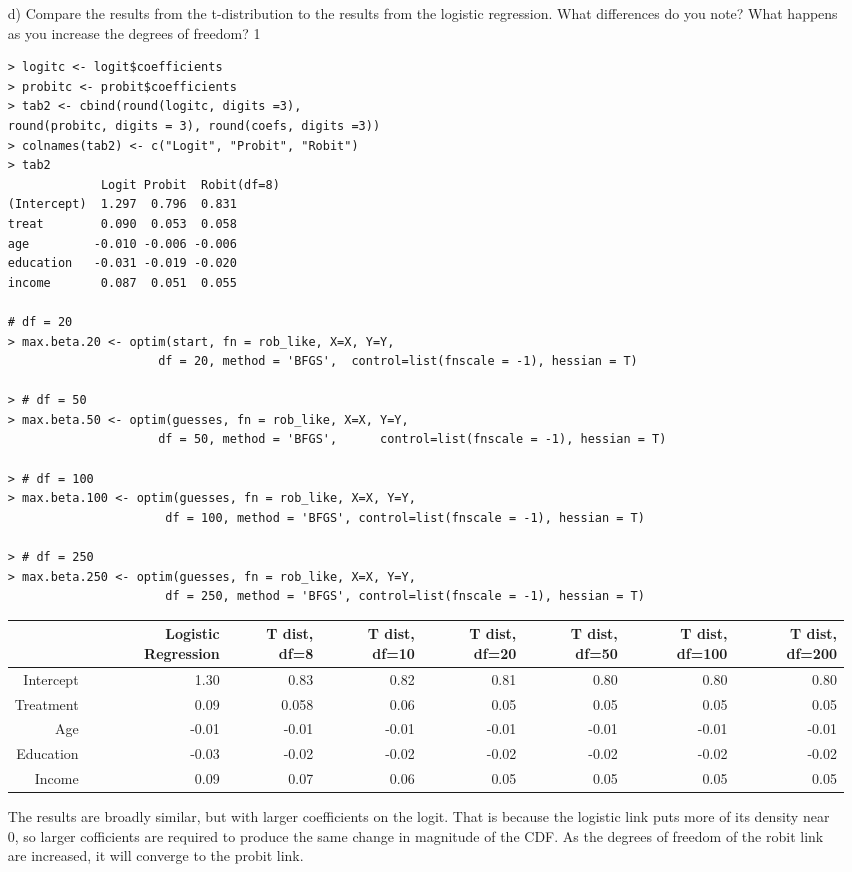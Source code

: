 \documentclass[letterpaper,12pt]{article}
\numberwithin{equation}{section}
\numberwithin{equation}{section}
\newcommand{\solutions}{1}
\begin{document}
\begin{itemize}
\item[d)] Compare the results from the t-distribution to the results from the logistic regression.  What differences do you note? What happens as you increase the degrees of freedom?
\if \solutions1
{\color{red}
\begin{verbatim}
> logitc <- logit$coefficients
> probitc <- probit$coefficients
> tab2 <- cbind(round(logitc, digits =3), 
round(probitc, digits = 3), round(coefs, digits =3))
> colnames(tab2) <- c("Logit", "Probit", "Robit")
> tab2
             Logit Probit  Robit(df=8)
(Intercept)  1.297  0.796  0.831
treat        0.090  0.053  0.058
age         -0.010 -0.006 -0.006
education   -0.031 -0.019 -0.020
income       0.087  0.051  0.055

# df = 20
> max.beta.20 <- optim(start, fn = rob_like, X=X, Y=Y, 
                     df = 20, method = 'BFGS', 	control=list(fnscale = -1), hessian = T)

> # df = 50
> max.beta.50 <- optim(guesses, fn = rob_like, X=X, Y=Y, 
                     df = 50, method = 'BFGS', 		control=list(fnscale = -1), hessian = T)

> # df = 100
> max.beta.100 <- optim(guesses, fn = rob_like, X=X, Y=Y, 
                      df = 100, method = 'BFGS', control=list(fnscale = -1), hessian = T)

> # df = 250
> max.beta.250 <- optim(guesses, fn = rob_like, X=X, Y=Y, 
                      df = 250, method = 'BFGS', control=list(fnscale = -1), hessian = T)
\end{verbatim}
\begin{table}[ht]
\tiny
\centering
\begin{tabular}{rrrrrrrr}
  \hline
 & Logistic Regression & T dist, df=8 & T dist, df=10 & T dist, df=20 & T dist, df=50 & T dist, df=100 & T dist, df=200 \\ 
  \hline
Intercept & 1.30 & 0.83 & 0.82 & 0.81 & 0.80 & 0.80 & 0.80 \\ 
  Treatment & 0.09 & 0.058 & 0.06 & 0.05 & 0.05 & 0.05 & 0.05 \\ 
  Age & -0.01 & -0.01 & -0.01 & -0.01 & -0.01 & -0.01 & -0.01 \\ 
  Education & -0.03 & -0.02 & -0.02 & -0.02 & -0.02 & -0.02 & -0.02 \\ 
  Income & 0.09 & 0.07 & 0.06 & 0.05 & 0.05 & 0.05 & 0.05 \\ 
   \hline
\end{tabular}
\end{table}
The results are broadly similar, but with larger coeﬃcients on the logit. That is because the logistic link puts more of its density near 0, so larger coﬃcients are required to produce the same change in magnitude of the CDF. As the degrees of freedom of the robit link are increased, it will converge to the probit link.
}
\fi

\end{itemize}
\end{document}
